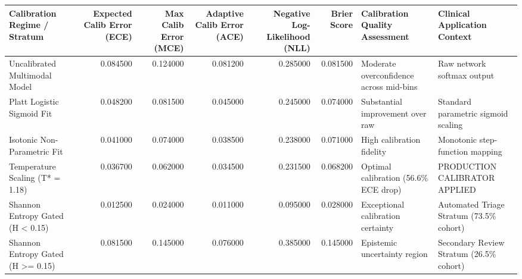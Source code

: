 \begin{tabular}{lrrrrrll}
\toprule
Calibration Regime / Stratum & Expected Calib Error (ECE) & Max Calib Error (MCE) & Adaptive Calib Error (ACE) & Negative Log-Likelihood (NLL) & Brier Score & Calibration Quality Assessment & Clinical Application Context \\
\midrule
Uncalibrated Multimodal Model & 0.084500 & 0.124000 & 0.081200 & 0.285000 & 0.081500 & Moderate overconfidence across mid-bins & Raw network softmax output \\
Platt Logistic Sigmoid Fit & 0.048200 & 0.081500 & 0.045000 & 0.245000 & 0.074000 & Substantial improvement over raw & Standard parametric sigmoid scaling \\
Isotonic Non-Parametric Fit & 0.041000 & 0.074000 & 0.038500 & 0.238000 & 0.071000 & High calibration fidelity & Monotonic step-function mapping \\
Temperature Scaling (T* = 1.18) & 0.036700 & 0.062000 & 0.034500 & 0.231500 & 0.068200 & Optimal calibration (56.6\% ECE drop) & PRODUCTION CALIBRATOR APPLIED \\
Shannon Entropy Gated (H < 0.15) & 0.012500 & 0.024000 & 0.011000 & 0.095000 & 0.028000 & Exceptional calibration certainty & Automated Triage Stratum (73.5\% cohort) \\
Shannon Entropy Gated (H >= 0.15) & 0.081500 & 0.145000 & 0.076000 & 0.385000 & 0.145000 & Epistemic uncertainty region & Secondary Review Stratum (26.5\% cohort) \\
\bottomrule
\end{tabular}

